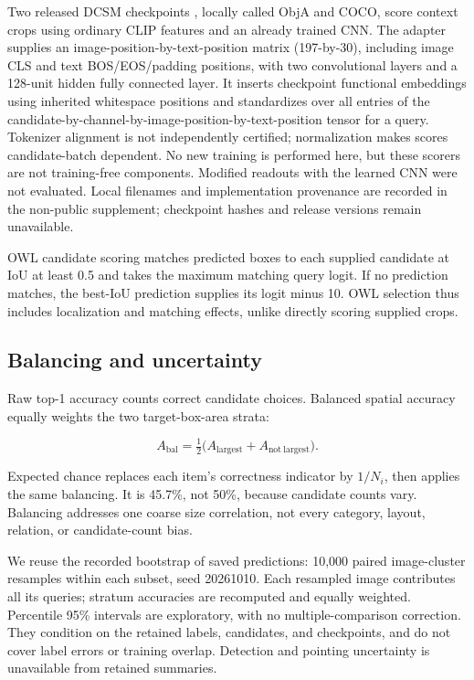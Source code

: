 \documentclass[10pt,twocolumn,letterpaper]{article}
\begin{document}
Two released DCSM checkpoints \citep{kang2025dcsm}, locally called ObjA
and COCO, score context crops using ordinary CLIP features and an
already trained CNN. The adapter supplies an
image-position-by-text-position matrix (197-by-30), including image CLS
and text BOS/EOS/padding positions, with two convolutional layers and a
128-unit hidden fully connected layer. It inserts checkpoint functional
embeddings using inherited whitespace positions and standardizes over
all entries of the
candidate-by-channel-by-image-position-by-text-position tensor for a
query. Tokenizer alignment is not independently certified; normalization
makes scores candidate-batch dependent. No new training is performed
here, but these scorers are not training-free components. Modified
readouts with the learned CNN were not evaluated. Local filenames and
implementation provenance are recorded in the non-public supplement;
checkpoint hashes and release versions remain unavailable.

OWL candidate scoring matches predicted boxes to each supplied candidate
at IoU at least 0.5 and takes the maximum matching query logit. If no
prediction matches, the best-IoU prediction supplies its logit minus 10.
OWL selection thus includes localization and matching effects, unlike
directly scoring supplied crops.

\subsection{Balancing and uncertainty}\label{balancing-and-uncertainty}

Raw top-1 accuracy counts correct candidate choices. Balanced spatial
accuracy equally weights the two target-box-area strata:

\[
A_{\mathrm{bal}}=\tfrac12\big(A_{\mathrm{largest}}+A_{\mathrm{not\ largest}}\big).
\]

Expected chance replaces each item's correctness indicator by \(1/N_i\),
then applies the same balancing. It is 45.7\%, not 50\%, because
candidate counts vary. Balancing addresses one coarse size correlation,
not every category, layout, relation, or candidate-count bias.

We reuse the recorded bootstrap of saved predictions: 10,000 paired
image-cluster resamples within each subset, seed 20261010. Each
resampled image contributes all its queries; stratum accuracies are
recomputed and equally weighted. Percentile 95\% intervals are
exploratory, with no multiple-comparison correction. They condition on
the retained labels, candidates, and checkpoints, and do not cover label
errors or training overlap. Detection and pointing uncertainty is
unavailable from retained summaries.
\end{document}
